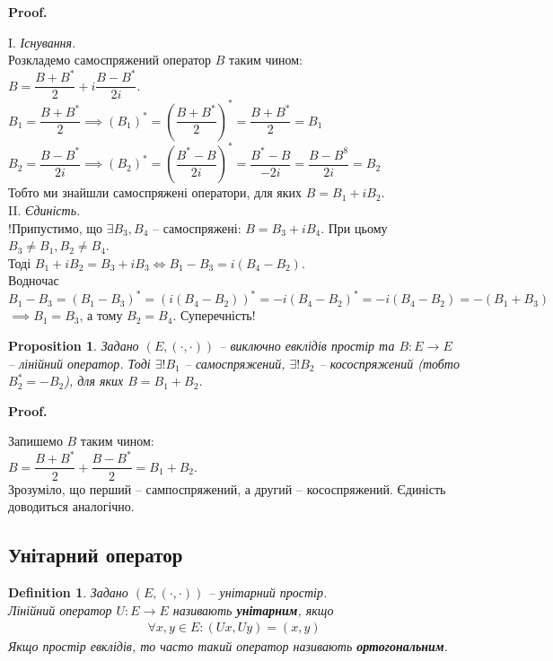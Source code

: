 \documentclass[a4paper, 10pt]{article}
\makeatletter
\theoremstyle{theoremdd}
\newtheorem{definition}[theorem]{Definition}
\newtheorem{proposition}[theorem]{Proposition}
\renewenvironment{proof}[1][Proof.\\]{\par
\pushQED{\hfill \qed}%
\normalfont \topsep6\p@\@plus6\p@\relax
\trivlist
\item\relax
{\bfseries
#1\@addpunct{.}}\hspace\labelsep\ignorespaces
}{%
\popQED\endtrivlist\@endpefalse
}
\makeatother
\begin{document}
\begin{proof}
I. \textit{Існування.}\\
Розкладемо самоспряжений оператор $B$ таким чином:\\
$B = \dfrac{B+B^*}{2}+ i \dfrac{B-B^*}{2i}$.\\
$B_1 = \dfrac{B+B^*}{2} \implies (B_1)^* = \left( \dfrac{B+B^*}{2} \right)^* = \dfrac{B+B^*}{2} = B_1$\\
$B_2 = \dfrac{B-B^*}{2i} \implies (B_2)^* = \left( \dfrac{B^*-B}{2i} \right)^* = \dfrac{B^*-B}{-2i} = \dfrac{B-B^8}{2i} = B_2$\\
Тобто ми знайшли самоспряжені оператори, для яких $B = B_1 + iB_2$.
\bigskip \\
II. \textit{Єдиність.}\\
!Припустимо, що $\exists B_3, B_4$ -- самоспряжені: $B = B_3 + i B_4$. При цьому $B_3 \neq B_1, B_2 \neq B_4$.\\
Тоді $B_1 + iB_2 = B_3 + iB_3 \iff B_1-B_3 = i(B_4-B_2)$.\\
Водночас $B_1-B_3=(B_1-B_3)^* = (i(B_4-B_2))^* = -i(B_4-B_2)^* = -i(B_4-B_2) = -(B_1+B_3)$\\
$\implies B_1 = B_3$, а тому $B_2 = B_4$. Суперечність!
\end{proof}

\begin{proposition}
Задано $(E,(\cdot,\cdot))$ -- виключно евклідів простір та $B \colon E \to E$ -- лінійний оператор. Тоді $\exists! B_1$ -- самоспряжений, $\exists! B_2$ -- кососпряжений (тобто $B_2^* = -B_2$), для яких $B = B_1 + B_2$.
\end{proposition}

\begin{proof}
Запишемо $B$ таким чином:\\
$B = \dfrac{B+B^*}{2} + \dfrac{B-B^*}{2} = B_1 + B_2$.\\
Зрозуміло, що перший -- сампоспряжений, а другий -- кососпряжений. Єдиність доводиться аналогічно.
\end{proof}

\subsection{Унітарний оператор}
\begin{definition}
Задано $(E,(\cdot,\cdot))$ -- унітарний простір.\\
Лінійний оператор $U \colon E \to E$ називають \textbf{унітарним}, якщо
\begin{align*}
\forall x,y \in E: (Ux,Uy) = (x,y)
\end{align*}
Якщо простір евклідів, то часто такий оператор називають \textbf{ортогональним}.
\end{definition}
\end{document}
